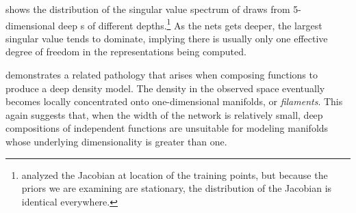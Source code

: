 \documentclass{article} %
\begin{document}
%
 shows the distribution of the singular value spectrum of draws from 5-dimensional deep \gp{}s of different depths.\footnote{\citet{rifai2011contractive} analyzed the Jacobian at location of the training points, but because the priors we are examining are stationary, the distribution of the Jacobian is identical everywhere.}
As the nets gets deeper, the largest singular value tends to dominate, implying there is usually only one effective degree of freedom in the representations being computed.

 demonstrates a related pathology that arises when composing functions to produce a deep density model.
The density in the observed space eventually becomes locally concentrated onto one-dimensional manifolds, or \emph{filaments}.
This again suggests that, when the width of the network is relatively small, deep compositions of independent functions are unsuitable for modeling manifolds whose underlying dimensionality is greater than one.
\end{document}
